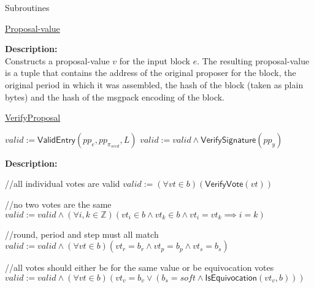 \documentclass[10pt,a4paper]{article}
\begin{document}
\begin{section}{Subroutines}
\begin{algorithm}[H]
\begin{algorithmic}[1]
    \EndFunction
    \end{algorithmic}
    \caption{\underline{Proposal-value}}
\end{algorithm}

\noindent \textbf{Description:}\\ Constructs a proposal-value $v$ for the input block $e$.
The resulting proposal-value is a tuple that contains the address of the original proposer for
the block, the original period in which it was assembled, the hash of the block (taken as plain bytes) 
and the hash of the msgpack encoding of the block.


\begin{algorithm}[H]
    \caption{\underline{VerifyProposal}}
    \label{algo:verify-proposal}
    \begin{algorithmic}[1]

    \State $valid := \mathsf{ValidEntry}(pp_e, pp_{\pi_{seed}}, L)$
    \State $valid := valid \land \mathsf{VerifySignature}(pp_y)$

    \EndFunction
    \end{algorithmic}
\end{algorithm}

\noindent \textbf{Description:}\\


\begin{algorithm}[H]\label{algo:verify-bundle}
    \begin{algorithmic}[1]

    //all individual votes are valid
    \State $valid := (\forall vt \in b)(\mathsf{VerifyVote}(vt))$
    
    //no two votes are the same
    \State $valid := valid \land (\forall i,k \in \mathbb{Z})(vt_i \in b \land vt_k \in b \land vt_i = vt_k \implies i=k)$

    //round, period and step must all match
    \State $valid := valid \land (\forall vt \in b)(vt_r = b_r \land vt_p = b_p \land vt_s = b_s)$
  
    //all votes should either be for the same value or be equivocation votes
    \State $valid := valid \land (\forall vt \in b)(vt_v = b_v \lor (b_s = soft \land \mathsf{IsEquivocation}(vt_v, b)))$


\end{algorithmic}
\end{algorithm}
\end{section}
\end{document}
